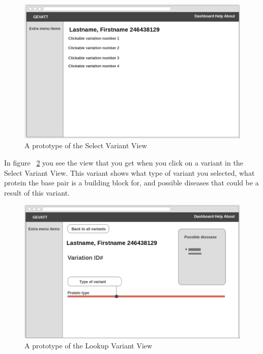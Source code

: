 \begin{figure}[H]
\includegraphics[scale=0.4]{select_variation.png}
\caption{A prototype of the Select Variant View}
\label{fig:selectvariationview}
\end{figure} 
In figure ~\ref{fig:lookupvariant} you see the view that you get when you click on a variant in the Select Variant View. This variant shows what type of variant you selected, what protein the base pair is a building block for, and possible diseases that could be a result of this variant.
\begin{figure}[H]
\includegraphics[scale=0.4]{lookup_variant.png}
\caption{A prototype of the Lookup Variant View}
\label{fig:lookupvariant}
\end{figure}
